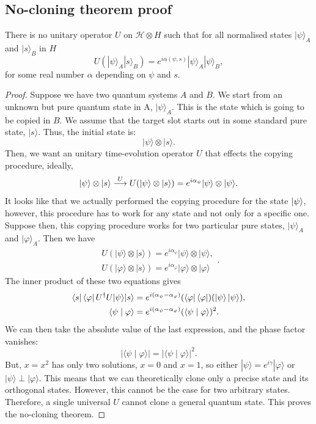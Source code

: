 \subsection*{No-cloning theorem proof}
\begin{theorem}
There is no unitary operator $U$ on $\mathcal{H} \otimes H$ such that for all normalised states $|\psi\rangle_{A}$ and $|s\rangle_{B}$ in $H$
$$
U\left(|\psi\rangle_{A}|s\rangle_{B}\right)=e^{i \alpha(\psi, s)}|\psi\rangle_{A}|\psi\rangle_{B},
$$
for some real number $\alpha$ depending on $\psi$ and $s$.
\end{theorem}
\begin{proof}
Suppose we have two quantum systems $A$ and $B$.
We start from an unknown but pure quantum state in 
A, $|\psi\rangle_A$. This is the state which is going to be copied in $B$. We assume that the target slot starts out in some standard pure state, $|s\rangle$. Thus, the initial state is:
$$
|\psi\rangle \otimes|s\rangle .
$$
Then, we want an unitary time-evolution operator $U$ that effects the copying procedure, ideally,
$$
\ket{\psi}\otimes|s\rangle \stackrel{U}{\longrightarrow} U(|\psi\rangle \otimes|s\rangle)=e^{i\alpha_{\psi}}|\psi\rangle \otimes|\psi\rangle.
$$
It looks like that we actually performed the copying procedure for the state $\ket{\psi}$, however, this procedure has to work for any state and not only for a specific one. 
Suppose then, this copying procedure works for two particular pure states, $|\psi\rangle_A$ and $|\varphi\rangle_A$. Then we have
$$
\begin{array}{c}
U(|\psi\rangle \otimes|s\rangle)=e^{i\alpha_{\psi}}|\psi\rangle \otimes|\psi\rangle, \\
U(|\varphi\rangle \otimes|s\rangle)=e^{i\alpha_{\varphi}}|\varphi\rangle \otimes|\varphi\rangle
\end{array}.
$$
The inner product of these two equations gives
\begin{align*}
    \bra{s}\bra{\varphi}U^{\dagger}U|\psi\rangle|s\rangle &= e^{i(\alpha_{\psi} -\alpha_{\varphi})}(\bra{\varphi}\bra{\varphi})(\ket{\psi}\ket{\psi}),
    \\
    \langle\psi \mid \varphi\rangle&= e^{i(\alpha_{\psi} -\alpha_{\varphi})}(\langle\psi \mid \varphi\rangle)^{2}.
\end{align*}
We can then take the absolute value of the last expression, and the phase factor vanishes: 
\begin{equation*}
     |\langle \psi \mid \varphi\rangle|=|\langle\psi \mid \varphi\rangle|^{2}.
\end{equation*}
But, $x=x^{2}$ has only two solutions, $x=0$ and $x=1$, so either $|\psi\rangle=e^{i\gamma}|\varphi\rangle$ or $|\psi\rangle \perp |\varphi\rangle$. This means that we can theoretically clone only a precise state and its orthogonal states. However, this cannot be the case for two arbitrary states. Therefore, a single universal $U$ cannot clone a general quantum state. This proves the no-cloning theorem. 
\end{proof}


